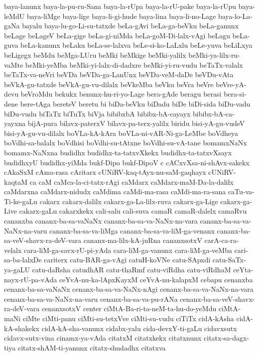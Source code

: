 {baya-lanunx
baya-la-pu-ru-Sana
baya-la-rUpa
baya-la-rU-pake
baya-la-rUpu
baya-leMdU
baya-liMge
baya-lige
baya-li-gi-hude
baya-lina
baya-li-no-Lage
baya-lo-La-gaNa
bayalu
baya-lu-go-Li-su-tatxde
beLa-gAvi
beLa-ga-beVku
beLa-ganunx
beLage
beLageV
beLa-gige
beLa-gi-niMda
beLa-goM-Di-lalx-vAgi
beLagu
beLa-guva
beLa-kanunx
beLaku
beLa-se-lalxva
beLe-si-ko-LaLxlu
beLe-yuva
beLiLxya
beLigegx
beMdu
beMga-LUru
beMki
beMkige
beMki-yalilx
beMki-ya-lilx-ru-vaMte
beMki-yeMba
beMki-yi-lalx-di-dadxre
beMki-yi-ru-vudu
beTaTx-valalx
beTaTx-va-neVri
beVDa
beVDa-ga-LanUnx
beVDa-veM-daDe
beVDu-vAta
beVkA-gu-tatxde
beVkA-gu-vu-dilalx
beVkeMba
beVku
beVra
beVre
beVre-yA-devu
beVroMdu
bekukx
benunx-hu-ri-yo-Lage
bera-gAde
beragu
berasi
bera-si-dene
bere-tAga
bereteV
beretu
bi
biDa-beVku
biDadu
biDe
biDi-sida
biDu-vadu
biDu-vudu
biTaTx
biTuTx
biVja
bibibxbA
bibibx-bA-cayayx
bibibx-bA-ca-yayxna
bijA-pura
bilavx-paterxV
bilavx-pa-terx-yalilx
biridu
bisi-yA-gu-vudeV
bisi-yA-gu-vu-dilalx
boVLa-kA-kAra
boVLa-ni-vAR-Ni-ga-LeMbe
boVdheya
boVdhi-sa-balalx
boVdhisi
boVdhi-su-tAtxne
boVdhi-su-vA-tane
bomamxNaNx
bomamx-NaNxna
budidhx
budidhx-ta-tatxvXkekx
budidhx-ta-tatxvXsayx
budidhxyU
budidhx-yiMda
bukf-Dipo
bukf-DipoV
c
cACxvXsa-ni-shAvx-sakekx
cAkaSxM
cAma-rasa
cAritarx
cUNiRV-kaq-tAyx-nu-saM-gaqhayx
cUNiRV-kaqtaM
ca
caM
caMca-la-ci-tatx-rAgi
caMdarx
caMdarx-maM-Da-la-dalilx
caMdarxna
caMdarx-nidudx
caMdima
caMdi-ma-rasa
caMdi-ma-ra-sana
caTu-va-Ti-ke-gaLu
cakarx
cakarx-dalilx
cakarx-ga-La-lilx-ruva
cakarx-ga-Lige
cakarx-ga-Live
cakarx-gaLu
cakarxkekx
cali-salu
cali-suva
camaR
camaR-dalelx
camaRvu
cananxba
cananx-ba-sa-vaNaNx
cananx-ba-sa-va-NaNx-na-vara
cananx-ba-sa-va-NaNx-na-varu
cananx-ba-sa-va-liMga
cananx-ba-sa-va-liM-ga-venanx
cananx-ba-sa-veV-shavx-ra-deV-vara
cananx-ma-lilx-kA-juRna
cananxsotxV
carA-ca-ra-velalx
cara-liM-ga-savx-rU-pi-yAda
cara-liM-ga-vanunx
cara-liM-ga-veMba
cari-sa-ba-lalxDe
cariterx
catu-BAR-ga-vAgi
catuH-koVNe
catu-SApxdi
catu-SaTx-ya-gaLU
catu-daRsha
catudhAR
catu-thaRmf
catu-viRdha
catu-viRdhaM
ceYta-nayx-rU-pa-vAda
ceYvA-nu-ka-lApxKayxM
ceYvA-nu-kalapxM
cebapu
cenanxba
cenanx-ba-sa-vaNaNx
cenanx-ba-sa-va-NaNx-nAgi
cenanx-ba-sa-va-NaNx-na-vara
cenanx-ba-sa-va-NaNx-na-varu
cenanx-ba-sa-va-pu-rANa
cenanx-ba-sa-veV-shavx-ra-deV-vara
cenanxsotxV
center
ciMtA-Ba-ri-ta-neM-ta-hu-do-yeMdu
ciMtA-maNi
ciMte
ciMti-panu
ciMti-su-tetxVve
ciMti-su-vudu
ciTiTx
cidA-kAsha
cidA-kA-shakekx
cidA-kA-sha-vanunx
cidabx-yalu
cida-devxY-ti-gaLu
cidavxsutx
cidavx-sutx-vina
cinamx-ya-vAda
citatxM
citatxkekx
citatxnunx
citatx-sa-dagx-tiya
citatx-shAM-ti-yanunx
citatx-shudadhx
citatxva
}
